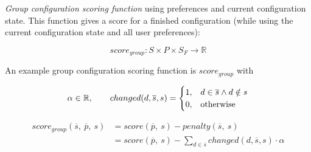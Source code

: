 \documentclass{article}
\begin{document}

\emph{Group configuration scoring function} using preferences and current configuration state. This function gives a score for a finished configuration (while using the current configuration state and all user preferences):

\begin{equation}
    score_{group}: S \times P \times S_F \to \mathbb{R}
\end{equation}

An example group configuration scoring function is $score_{group}$ with

\begin{equation}
    \notag \alpha \in \mathbb{R}, \qquad     changed(d,\overline{s}, s) = 
    \begin{cases}
      1, & d \in \overline{s} \land d \notin s \\
      0, & \text{otherwise}
    \end{cases}
\end{equation}

\begin{equation}
    \begin{split}
        score_{group}(\overline{s},\ \overline{p},\ s)
        & = score(\overline{p},\ s) - penalty(\overline{s},\ s) \\
        & = score(\overline{p},\ s) - \sum_{d \in \overline{s}} changed(d,\overline{s}, s) \cdot \alpha
    \end{split}
\end{equation}
\end{document}
